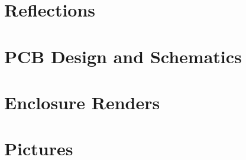 \documentclass[11pt,letterpaper]{article}
\begin{document}
\section{Reflections}
\label{sec:reflections}

\clearpage

{}

\clearpage

\appendix
\section{PCB Design and Schematics}
\label{sec:appendix-schematics}

\clearpage

\section{Enclosure Renders}
\label{sec:appendix-enclosure}

\clearpage

\section{Pictures}
\label{sec:appendix-pictures}

\clearpage

%
%

%
%
\end{document}
